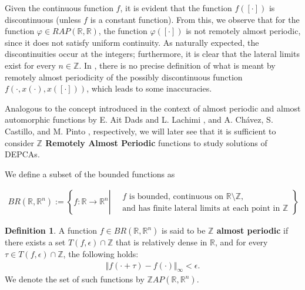 \documentclass[english,,reqno]{amsart}
\numberwithin{equation}{section}
\theoremstyle{plain}
\theoremstyle{definition}
\newtheorem{defn}{Definition}[section]
\theoremstyle{remark}
\begin{document}
Given the continuous function $f$, it is evident that the function $f([\cdot])$ is discontinuous (unless $f$ is a constant function).  
From this, we observe that for the function $\varphi \in RAP(\mathbb{R},\mathbb{R})$, the function $\varphi([\cdot])$ is not remotely almost periodic, since it does not satisfy uniform continuity.  
As naturally expected, the discontinuities occur at the integers; furthermore, it is clear that the lateral limits exist for every $n \in \mathbb{Z}$.  
In \cite{zhang_depca}, there is no precise definition of what is meant by remotely almost periodicity of the possibly discontinuous function $f(\cdot, x(\cdot), x([\cdot]))$, which leads to some inaccuracies.  

Analogous to the concept introduced in the context of almost periodic and almost automorphic functions by E. Ait Dads and L. Lachimi \cite{lachimi}, and A. Ch\'{a}vez, S. Castillo, and M. Pinto \cite{alan}, respectively,  
we will later see that it is sufficient to consider \textbf{$\mathbb{Z}$ Remotely Almost Periodic} functions to study solutions of DEPCAs.

We define a subset of the bounded functions as  

\begin{eqnarray*}
BR(\mathbb{R},\mathbb{R}^{n}) :=
\left\{
 f:\mathbb{R} \rightarrow \mathbb{R}^{n}  \left| 
 \begin{aligned}
\quad f \text{ is bounded, continuous on } \mathbb{R}\setminus\mathbb{Z}, \\
\quad  \text{and has finite lateral limits at each point in } \mathbb{Z}
\end{aligned}
\right.
\right\}
\end{eqnarray*}



\begin{defn}\label{def_ZAP}
A function $f \in BR(\mathbb{R}, \mathbb{R}^n)$ is said to be \textbf{$\mathbb{Z}$ almost periodic} if there exists a set $T(f, \epsilon) \cap \mathbb{Z}$ that is relatively dense in $\mathbb{R}$,  
and for every $\tau \in T(f, \epsilon) \cap \mathbb{Z}$, the following holds:  
\begin{eqnarray*}
\Vert f(\cdot + \tau) - f(\cdot) \Vert_{\infty} < \epsilon.
\end{eqnarray*}  
We denote the set of such functions by $\mathbb{Z}AP(\mathbb{R}, \mathbb{R}^n)$.
\end{defn}
\end{document}
